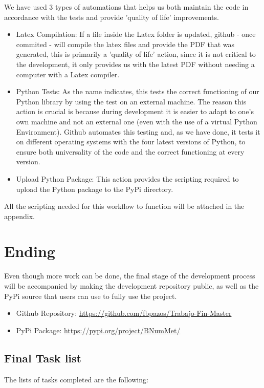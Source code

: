 We have used 3 types of automations that helps us both maintain the code in accordance with the tests and provide 'quality of life' improvements.
\begin{itemize}
    \item Latex Compilation: If a file inside the Latex folder is updated, github - once commited - will compile the latex files and provide the PDF that was generated, this is primarily a 'quality of life' action, since it is not critical to the development, it only provides us with the latest PDF without needing a computer with a Latex compiler.
    \item Python Tests: As the name indicates, this tests the correct functioning of our Python library by using the test on an external machine. The reason this action is crucial is because during development it is easier to adapt to one's own machine and not an external one (even with the use of a virtual Python Environment). Github automates this testing and, as we have done, it tests it on different operating systems with the four latest versions of Python, to ensure both universality of the code and the correct functioning at every version.
    \item Upload Python Package: This action provides the scripting required to upload the Python package to the PyPi directory.
\end{itemize}
All the scripting needed for this workflow to function will be attached in the appendix.

\section{Ending}
Even though more work can be done, the final stage of the development process will be accompanied by making the development repository public, as well as the PyPi source that users can use to fully use the project. 
\begin{itemize}
    \item Github Repository: \href{https://github.com/fbpazos/Trabajo-Fin-Master}{https://github.com/fbpazos/Trabajo-Fin-Master}
    \item PyPi Package: \href{https://pypi.org/project/BNumMet/}{https://pypi.org/project/BNumMet/}
\end{itemize}
\subsection{Final Task list}
The lists of tasks completed are the following:

